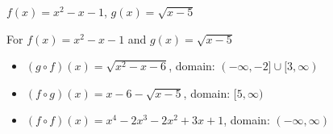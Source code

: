 {$f(x) = x^2-x-1$, $g(x) = \sqrt{x-5}$ }
{For  $f(x) = x^2-x-1$ and $g(x) = \sqrt{x-5}$ 

\begin{itemize}

\item  $(g \circ f)(x) = \sqrt{x^2-x-6}$, domain: $(-\infty, -2] \cup [3,\infty)$

\item  $(f \circ g)(x) =x-6-\sqrt{x-5}$, domain: $[5,\infty)$

\item  $(f \circ f)(x) =x^4-2x^3-2x^2+3x+1$, domain: $(-\infty, \infty)$

\end{itemize}}